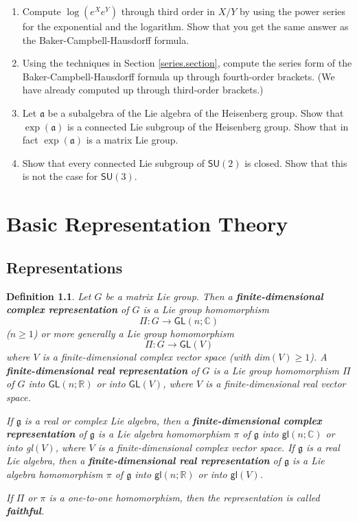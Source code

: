 \documentclass[12pt]{amsbook}
\let \frak = \mathfrak
\theoremstyle{plain}
\newtheorem{definition}[theorem]{Definition}
\numberwithin{equation}{chapter}
\numberwithin{theorem}{chapter}
\begin{document}
\begin{enumerate}
\item \label{by.series}Compute $\log\left(  e^{X}e^{Y}\right)  $ through third
order in $X/Y$ by using the power series for the exponential and the
logarithm. Show that you get the same answer as the Baker-Campbell-Hausdorff formula.

\item  Using the techniques in Section \ref{series.section}, compute the
series form of the Baker-Campbell-Hausdorff formula up through fourth-order
brackets. (We have already computed up through third-order brackets.)

\item \label{sub.heisenberg}Let $\frak{a}$ be a subalgebra of the Lie algebra
of the Heisenberg group. Show that $\exp\left(  \frak{a}\right)  $ is a
connected Lie subgroup of the Heisenberg group. Show that in fact $\exp\left(
\frak{a}\right)  $ is a matrix Lie group.

\item  Show that every connected Lie subgroup of $\mathsf{SU}\left(  2\right)
$ is closed. Show that this is not the case for $\mathsf{SU}\left(  3\right)
$.
\end{enumerate}

\chapter{Basic Representation Theory}

\section{Representations}

\begin{definition}
Let $G$ be a matrix Lie group. Then a \textbf{finite-dimensional complex
representation} of $G$ is a Lie group homomorphism
\[
\Pi:G\rightarrow\mathsf{GL}(n;\mathbb{C})
\]
($n\geq1$) or more generally a Lie group homomorphism
\[
\Pi:G\rightarrow\mathsf{GL}(V)
\]
where $V$ is a finite-dimensional complex vector space (with dim$(V)\geq1$). A
\textbf{finite-dimensional real representation} of $G$ is a Lie group
homomorphism $\Pi$ of $G$ into $\mathsf{GL}(n;\mathbb{R})$ or into
$\mathsf{GL}(V)$, where $V$ is a finite-dimensional real vector space.

If $\frak{g}$ is a real or complex Lie algebra, then a
\textbf{finite-dimensional complex representation} of $\frak{g}$ is a Lie
algebra homomorphism $\pi$ of $\frak{g}$ into $\mathsf{gl}(n;\mathbb{C})$ or
into \textsf{gl}$(V)$, where $V$ is a finite-dimensional complex vector space.
If $\frak{g}$ is a \textit{real} Lie algebra, then a
\textbf{finite-dimensional real representation} of $\frak{g}$ is a Lie algebra
homomorphism $\pi$ of $\frak{g}$ into $\mathsf{gl}(n;\mathbb{R})$ or into
$\mathsf{gl}(V)$.

If $\Pi$ or $\pi$ is a one-to-one homomorphism, then the representation is
called \textbf{faithful}.
\end{definition}
\end{document}
